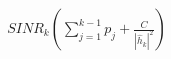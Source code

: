 \documentclass[preview]{standalone}
\begin{document}
\begin{align*}
SINR_k \left( \sum_{j=1}^{k-1} p_j + \frac{C}{\left|{\hat{h}_k}\right|^2} \right)
\end{align*}
\end{document}
